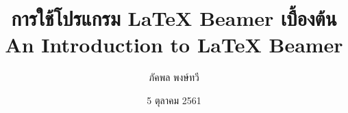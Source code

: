 \documentclass[xetex,serif,xcolor=dvipsnames]{beamer}
\title[Inpaint]{การใช้โปรแกรม {\LaTeX} Beamer เบื้องต้น \\ An Introduction to {\LaTeX} Beamer}
\author[Pakkapon]{ภัคพล พงษ์ทวี}
\institute[SU]{ภาควิชาคณิตศาสตร์ \\ มหาวิทยาลัยศิลปากร}
\date[5 ตค 2561]{5 ตุลาคม 2561}
\begin{document}
	\begin{frame}
	\titlepage
	\end{frame}
\end{document}
